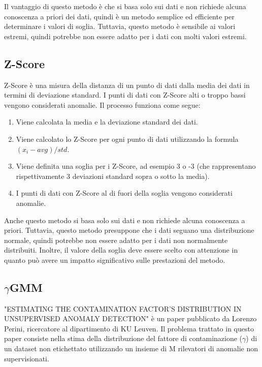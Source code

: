 Il vantaggio di questo metodo è che si basa solo sui dati e non richiede alcuna conoscenza a priori dei dati, quindi è un metodo semplice ed efficiente per determinare i valori di soglia. Tuttavia, questo metodo è sensibile ai valori estremi, quindi potrebbe non essere adatto per i dati con molti valori estremi.

\subsection{Z-Score}
Z-Score \cite{Bagdonavi_ius_2020} è una misura della distanza di un punto di dati dalla media dei dati in termini di deviazione standard. I punti di dati con Z-Score alti o troppo bassi vengono considerati anomalie.
Il processo funziona come segue:
\begin{enumerate}
\item Viene calcolata la media e la deviazione standard dei dati.
\item Viene calcolato lo Z-Score per ogni punto di dati utilizzando la formula $(x_i - avg) / std$.
\item Viene definita una soglia per i Z-Score, ad esempio 3 o -3 (che rappresentano rispettivamente 3 deviazioni standard sopra o sotto la media).
\item I punti di dati con Z-Score al di fuori della soglia vengono considerati anomalie.
\end{enumerate}
Anche questo metodo si basa solo sui dati e non richiede alcuna conoscenza a priori. Tuttavia, questo metodo presuppone che i dati seguano una distribuzione normale, quindi potrebbe non essere adatto per i dati non normalmente distribuiti. Inoltre, il valore della soglia deve essere scelto con attenzione in quanto può avere un impatto significativo sulle prestazioni del metodo.


\subsection{\texorpdfstring{$\gamma$}-GMM}
"ESTIMATING THE CONTAMINATION FACTOR’S DISTRIBUTION IN UNSUPERVISED ANOMALY DETECTION" \cite{https://doi.org/10.48550/arxiv.2210.10487} è un paper pubblicato da Lorenzo Perini, ricercatore al dipartimento di KU Leuven.
Il problema trattato in questo paper consiste nella stima della distribuzione del fattore di contaminazione ($\gamma$) di un dataset non etichettato utilizzando un insieme di M rilevatori di anomalie non supervisionati. 

